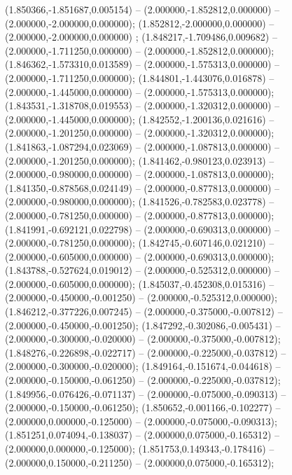  (1.850366,-1.851687,0.005154) -- (2.000000,-1.852812,0.000000) -- (2.000000,-2.000000,0.000000);
 (1.852812,-2.000000,0.000000) -- (2.000000,-2.000000,0.000000) ;
 (1.848217,-1.709486,0.009682) -- (2.000000,-1.711250,0.000000) -- (2.000000,-1.852812,0.000000);
 (1.846362,-1.573310,0.013589) -- (2.000000,-1.575313,0.000000) -- (2.000000,-1.711250,0.000000);
 (1.844801,-1.443076,0.016878) -- (2.000000,-1.445000,0.000000) -- (2.000000,-1.575313,0.000000);
 (1.843531,-1.318708,0.019553) -- (2.000000,-1.320312,0.000000) -- (2.000000,-1.445000,0.000000);
 (1.842552,-1.200136,0.021616) -- (2.000000,-1.201250,0.000000) -- (2.000000,-1.320312,0.000000);
 (1.841863,-1.087294,0.023069) -- (2.000000,-1.087813,0.000000) -- (2.000000,-1.201250,0.000000);
 (1.841462,-0.980123,0.023913) -- (2.000000,-0.980000,0.000000) -- (2.000000,-1.087813,0.000000);
 (1.841350,-0.878568,0.024149) -- (2.000000,-0.877813,0.000000) -- (2.000000,-0.980000,0.000000);
 (1.841526,-0.782583,0.023778) -- (2.000000,-0.781250,0.000000) -- (2.000000,-0.877813,0.000000);
 (1.841991,-0.692121,0.022798) -- (2.000000,-0.690313,0.000000) -- (2.000000,-0.781250,0.000000);
 (1.842745,-0.607146,0.021210) -- (2.000000,-0.605000,0.000000) -- (2.000000,-0.690313,0.000000);
 (1.843788,-0.527624,0.019012) -- (2.000000,-0.525312,0.000000) -- (2.000000,-0.605000,0.000000);
 (1.845037,-0.452308,0.015316) -- (2.000000,-0.450000,-0.001250) -- (2.000000,-0.525312,0.000000);
 (1.846212,-0.377226,0.007245) -- (2.000000,-0.375000,-0.007812) -- (2.000000,-0.450000,-0.001250);
 (1.847292,-0.302086,-0.005431) -- (2.000000,-0.300000,-0.020000) -- (2.000000,-0.375000,-0.007812);
 (1.848276,-0.226898,-0.022717) -- (2.000000,-0.225000,-0.037812) -- (2.000000,-0.300000,-0.020000);
 (1.849164,-0.151674,-0.044618) -- (2.000000,-0.150000,-0.061250) -- (2.000000,-0.225000,-0.037812);
 (1.849956,-0.076426,-0.071137) -- (2.000000,-0.075000,-0.090313) -- (2.000000,-0.150000,-0.061250);
 (1.850652,-0.001166,-0.102277) -- (2.000000,0.000000,-0.125000) -- (2.000000,-0.075000,-0.090313);
 (1.851251,0.074094,-0.138037) -- (2.000000,0.075000,-0.165312) -- (2.000000,0.000000,-0.125000);
 (1.851753,0.149343,-0.178416) -- (2.000000,0.150000,-0.211250) -- (2.000000,0.075000,-0.165312);
